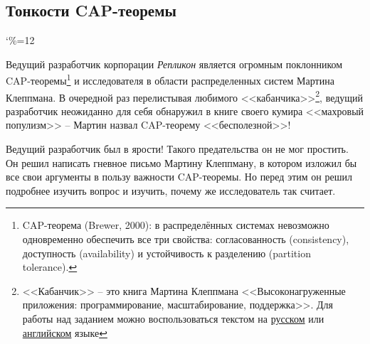 \documentclass[12pt]{article}
\begin{document}
\break
\subsection{Тонкости CAP-теоремы}

 \catcode`\%=12

\begin{flushleft}
Ведущий разработчик корпорации \textit{Репликон} является огромным поклонником CAP-теоремы\footnote{
	CAP-теорема (Brewer, 2000): в распределённых системах невозможно одновременно обеспечить
	все три свойства: согласованность (consistency), доступность (availability) и устойчивость к разделению (partition tolerance).
} и исследователя в области распределенных систем Мартина Клеппмана.
В очередной раз перелистывая любимого <<кабанчика>>\footnote{
	<<Кабанчик>> – это книга Мартина Клеппмана <<Высоконагруженные приложения: программирование, масштабирование, поддержка>>. Для работы над заданием можно воспользоваться текстом на
	\href{https://unidel.edu.ng/focelibrary/books/Designing%20Data-Intensive%20Applications%20The%20Big%20Ideas%20Behind%20Reliable,%20Scalable,%20and%20Maintainable%20Systems%20by%20Martin%20Kleppmann%20(z-lib.org).pdf}{русском}
	или \href{https://ftp.zhirov.kz/books/IT/Алгоритмы/Высоконагруженные%20приложения.%20Программирование%2C%20масштабирование%2C%20поддержка%20%28Мартин%20Клеппман%29.pdf}{английском} языке
}, ведущий разработчик неожиданно для себя обнаружил в книге
своего кумира <<махровый популизм>> – Мартин назвал CAP-теорему <<бесполезной>>!
\end{flushleft}

\begin{flushleft}
Ведущий разработчик был в ярости! Такого предательства он не мог простить. Он решил написать гневное письмо
Мартину Клеппману, в котором изложил бы все свои аргументы в пользу важности CAP-теоремы.
Но перед этим он решил подробнее изучить вопрос и изучить, почему же исследователь так считает.
\end{flushleft}
\end{document}
